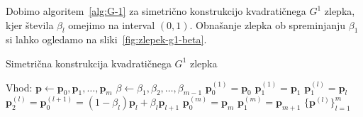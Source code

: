 \documentclass[isrm2, tisk]{fmfdelo}
\newcommand{\p}{\mathbf{p}}
\begin{document}
    Dobimo algoritem~\ref{alg:G-1} za simetrično konstrukcijo kvadratičnega $G^1$ zlepka, kjer števila $\beta_l$ omejimo na interval $(0,1)$.
    Obnašanje zlepka ob spreminjanju $\beta_1$ si lahko ogledamo na sliki~\ref{fig:zlepek-g1-beta}.
    \begin{algorithm}[H]
        \caption{Simetrična konstrukcija kvadratičnega $G^1$ zlepka}
        \label{alg:G-1}
        \begin{algorithmic}
            \State Vhod:
            \State $\p \gets \p_0,\p_1,\dots,\p_{m}$
            \State $\beta \gets \beta_1,\beta_2,\dots,\beta_{m-1}$
            \State
            \State $\p_0^{(1)} = \p_0$
            \State $\p_1^{(1)} = \p_1$
                \State $\p_1^{(l)}=\p_{l}$
                \State $\p_2^{(l)} = \p_0^{(l+1)} = (1-\beta_l)\p_l+\beta_l\p_{l+1}$
            \EndFor
            \State $\p_0^{(m)} = \p_m$
            \State $\p_1^{(m)} = \p_{m+1}$
            \State
            \State \Return $\{\mathbf{p}^{(l)}\}^{m}_{l=1}$
        \end{algorithmic}
    \end{algorithm}
\end{document}
